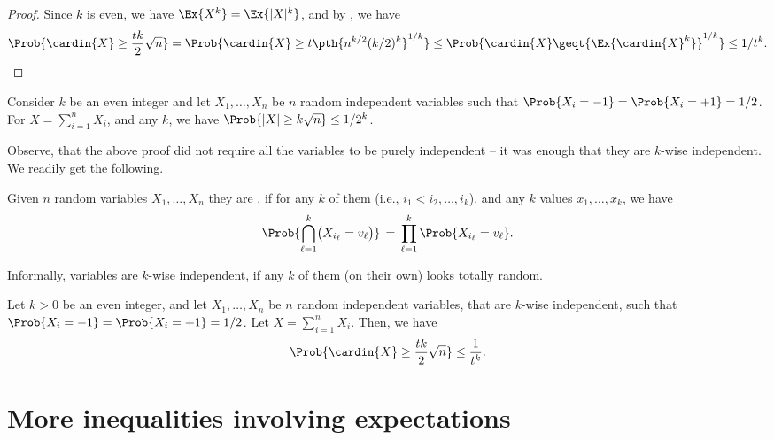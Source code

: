 \begin{proof}
    Since $k$ is even, we have $\Ex{X^k} = \Ex{|X|^k}$, and by
    , we have
    \begin{align*}
      \Prob{\cardin{X} \geq \frac{tk}{2} \sqrt{n}}%
      =%
      \Prob{\cardin{X} \geq t \pth{n^{k/2} (k/2)^k}^{1/k}}
      \leq
      \Prob{ \cardin{X} \geq%
      t {\Ex{ \bigl. {\cardin{X}}^k} }^{1/k}} \leq {1}/{t^k}.
    \end{align*}
\end{proof}


\begin{corollary}
    Consider $k$ be an even integer and let $X_1, \ldots, X_n$ be $n$
    random independent variables such that
    $\Prob{X_i=-1} = \Prob{X_i =+1} = 1/2$. For
    $X = \sum_{i=1}^n X_i$, and any $k$, we have
    $\Prob{|X| \geq k \sqrt{n}} \leq 1/2^k$.
\end{corollary}

Observe, that the above proof did not require all the variables to be
purely independent -- it was enough that they are $k$-wise
independent. We readily get the following.

\begin{defn}
    Given $n$ random variables $X_1, \ldots, X_n$ they are
    , if for any $k$ of them (i.e.,
    $i_1 < i_2, \ldots, i_k$), and any $k$ values $x_1, \ldots, x_k$,
    we have\
    \begin{equation*}
        \Prob{\Bigl. \smash{\bigcap_{\ell=1}^k} \bigl(X_{i_{\ell}} = v_\ell\bigr)}%
        \,=\,%
        \prod_{\ell=1}^k \Prob{  X_{i_{\ell}} = v_\ell }.
    \end{equation*}
\end{defn}
Informally, variables are $k$-wise independent, if any
$k$ of them (on their own) looks totally random.

\begin{lemma}
    Let $k > 0 $ be an even integer, and let $X_1, \ldots, X_n$ be $n$
    random independent variables, that are $k$-wise independent, such
    that $\Prob{X_i=-1} = \Prob{X_i =+1} = 1/2$. Let
    $X = \sum_{i=1}^n X_i$. Then, we have
    \begin{align*}
      \Prob{\smash{\cardin{X} \geq \frac{tk}{2} \sqrt{n}}\Bigr.}%
      \leq%
      \frac{1}{t^k}.
    \end{align*}
\end{lemma}

\section{More inequalities involving expectations}

